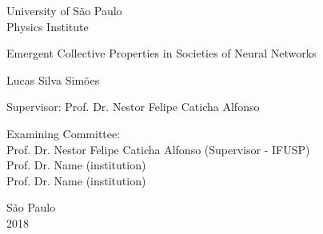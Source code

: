 
\pagestyle{empty}
\begin{center}

	{\fontsize{16}{16} \selectfont University of São Paulo \\}
	\vspace{0.1cm}
	{\fontsize{16}{16} \selectfont Physics Institute}
    \vspace{3.3cm}

	{\fontsize{22}{22}\selectfont Emergent Collective Properties in Societies of Neural Networks \par}
    \vspace{2cm}


    {\fontsize{18}{18}\selectfont Lucas Silva Simões \par}

    \vspace{2cm}

\end{center}

\leftskip 6cm
\begin{flushright}
\leftskip 6cm
Supervisor: Prof. Dr. Nestor Felipe Caticha Alfonso
\end{flushright}

    \vspace{0.8cm}


\par
\leftskip 6cm
\par
\leftskip 0cm
\vskip 2cm


\noindent Examining Committee: \\
\noindent Prof. Dr. Nestor Felipe Caticha Alfonso (Supervisor - IFUSP)\\
Prof. Dr. Name (institution)\\
Prof. Dr. Name (institution)\\
\vspace{2.5cm}


\centering
    {São Paulo \\  2018}
\clearpage

% 
